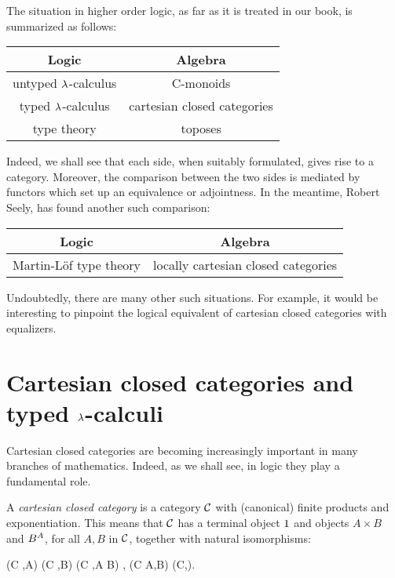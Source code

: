 The situation in higher order logic, as far as it is treated in our book,
is summarized as follows:

\medskip
\renewcommand{\arraystretch}{1.5}

\begin{center}
\begin{tabular}{ c | c }
 \hline
Logic & Algebra \\
 \hline
 untyped $\lambda$-calculus & C-monoids \\
 typed $\lambda$-calculus & cartesian closed categories \\
 type theory & toposes \\
 \hline
\end{tabular}
\end{center}
\medskip

\noindent
Indeed, we shall see that each side, when suitably formulated, gives rise to a
category. Moreover, the comparison between the two sides is mediated by
functors which set up an equivalence or adjointness. In the meantime, Robert
Seely, has found another such comparison:

\begin{center}
\begin{tabular}{ c | c }
 \hline
Logic & Algebra \\
 \hline
Martin-L\"of type theory  & locally cartesian closed categories \\
 \hline
\end{tabular}
\end{center}
\medskip

\noindent
Undoubtedly, there are many other such situations. For example, it would be
interesting to pinpoint the logical equivalent of cartesian closed categories
with equalizers.

\section{Cartesian closed categories and typed $\lambda$-calculi}

Cartesian closed categories are becoming increasingly important in many
branches of mathematics. Indeed, as we shall see, in logic they play a fundamental
role.

A {\em cartesian closed category} is a category $\mathcal C$ with (canonical) finite
products and exponentiation. This means that $\mathcal C$ has a terminal object $1$ and
objects $A \times B$ and $B^{A}$, for all $A,B$ in $\mathcal C$, together
with natural isomorphisms:

\bes
\Hom(C ,A) \times \Hom(C ,B)  \iso \Hom(C ,A \times B) ,
\ees
\bes
\Hom(C \times A,B) \iso \Hom(C,).
\ees

